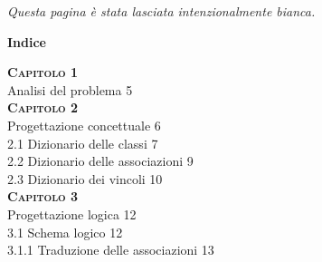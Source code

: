 \documentclass[a4paper,12pt]{article}
\begin{document}
\newpage\null\thispagestyle{empty}
\begin{center}
\vfil
\vfil
\textit{Questa pagina è stata lasciata intenzionalmente bianca. } 
\vfil
\vfil 
\end{center}
\newpage

\newpage\null{}\setcounter{page}{3}
\begin{flushleft}
\vspace{-1.5cm}
\begingroup
\fontsize{35pt}{12pt}\selectfont\bf{Indice}
\endgroup
\vspace*{+1cm}


\Large\textsc{\bf Capitolo 1}\\
\hspace{+1cm} \large Analisi del problema \hfill 5\\

\Large\textsc{\bf Capitolo 2}\\
\hspace{+1cm}\large Progettazione concettuale \hfill 6\\
\hspace{+2cm}\large 2.1 Dizionario delle classi \hfill 7\\
\hspace{+2cm}\large 2.2 Dizionario delle associazioni \hfill 9\\
\hspace{+2cm}\large 2.3 Dizionario dei vincoli \hfill 10\\

\Large\textsc{\bf Capitolo 3}\\
\hspace{+1cm}\large Progettazione logica \hfill 12\\
\hspace{+2cm}\large 3.1 Schema logico \hfill 12\\
\hspace{+3cm}\normalsize 3.1.1 Traduzione delle associazioni \hfill 13\\


\end{flushleft}
\end{document}
